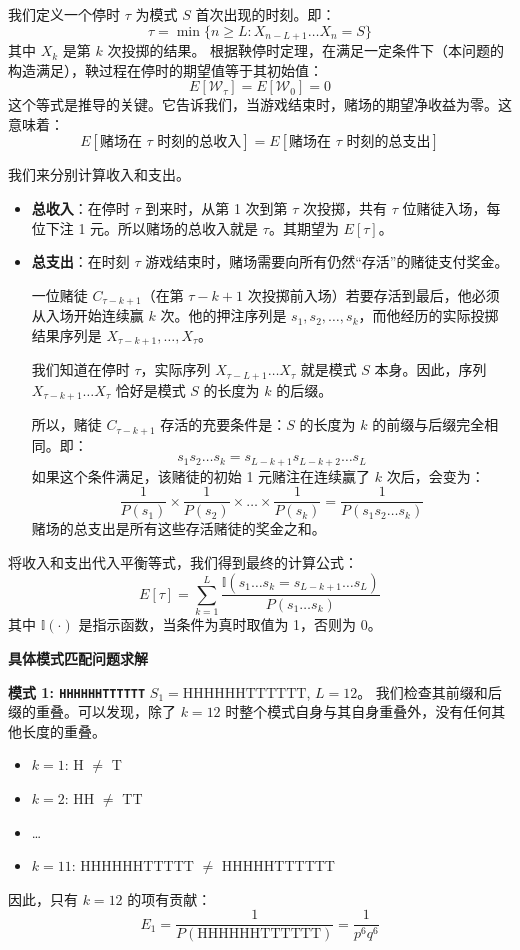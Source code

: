 \documentclass[UTF8]{ctexart}
\begin{document}
我们定义一个停时 $\tau$ 为模式 $S$ 首次出现的时刻。即：
$$ \tau = \min\{ n \ge L : X_{n-L+1} \dots X_n = S \} $$
其中 $X_k$ 是第 $k$ 次投掷的结果。
根据鞅停时定理，在满足一定条件下（本问题的构造满足），鞅过程在停时的期望值等于其初始值：
$$ E[\mathcal{W}_\tau] = E[\mathcal{W}_0] = 0 $$
这个等式是推导的关键。它告诉我们，当游戏结束时，赌场的期望净收益为零。这意味着：
$$ E[\text{赌场在 }\tau\text{ 时刻的总收入}] = E[\text{赌场在 }\tau\text{ 时刻的总支出}] $$

我们来分别计算收入和支出。
\begin{itemize}
    \item \textbf{总收入}：在停时 $\tau$ 到来时，从第 1 次到第 $\tau$ 次投掷，共有 $\tau$ 位赌徒入场，每位下注 1 元。所以赌场的总收入就是 $\tau$。其期望为 $E[\tau]$。
    \item \textbf{总支出}：在时刻 $\tau$ 游戏结束时，赌场需要向所有仍然“存活”的赌徒支付奖金。
    
    一位赌徒 $C_{\tau-k+1}$（在第 $\tau-k+1$ 次投掷前入场）若要存活到最后，他必须从入场开始连续赢 $k$ 次。他的押注序列是 $s_1, s_2, \dots, s_k$，而他经历的实际投掷结果序列是 $X_{\tau-k+1}, \dots, X_\tau$。
    
    我们知道在停时 $\tau$，实际序列 $X_{\tau-L+1} \dots X_\tau$ 就是模式 $S$ 本身。因此，序列 $X_{\tau-k+1} \dots X_\tau$ 恰好是模式 $S$ 的长度为 $k$ 的后缀。
    
    所以，赌徒 $C_{\tau-k+1}$ 存活的充要条件是：$S$ 的长度为 $k$ 的前缀与后缀完全相同。即：
    $$ s_1s_2\dots s_k = s_{L-k+1}s_{L-k+2}\dots s_L $$
    如果这个条件满足，该赌徒的初始 1 元赌注在连续赢了 $k$ 次后，会变为：
    $$ \frac{1}{P(s_1)} \times \frac{1}{P(s_2)} \times \dots \times \frac{1}{P(s_k)} = \frac{1}{P(s_1s_2\dots s_k)} $$
    赌场的总支出是所有这些存活赌徒的奖金之和。
\end{itemize}
将收入和支出代入平衡等式，我们得到最终的计算公式：
$$ E[\tau] = \sum_{k=1}^{L} \frac{\mathbb{I}(s_1\dots s_k = s_{L-k+1}\dots s_L)}{P(s_1\dots s_k)} $$
其中 $\mathbb{I}(\cdot)$ 是指示函数，当条件为真时取值为 1，否则为 0。

\textbf{具体模式匹配问题求解}

\textbf{模式 1: \texttt{HHHHHHTTTTTT}}
$S_1 = \text{HHHHHHTTTTTT}$, $L=12$。
我们检查其前缀和后缀的重叠。可以发现，除了 $k=12$ 时整个模式自身与其自身重叠外，没有任何其他长度的重叠。
\begin{itemize}
    \item $k=1$: H $\neq$ T
    \item $k=2$: HH $\neq$ TT
    \item \dots
    \item $k=11$: HHHHHHTTTTT $\neq$ HHHHHTTTTTT
\end{itemize}
因此，只有 $k=12$ 的项有贡献：
$$ E_1 = \frac{1}{P(\text{HHHHHHTTTTTT})} = \frac{1}{p^6q^6} $$
\end{document}
